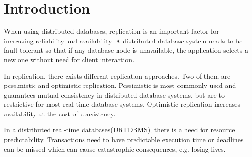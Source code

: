 \section{Introduction}
\label{sec:intro}

When using distributed databases, replication is an important factor for increasing reliability and availability. A distributed database system needs to be fault tolerant so that if any database node is unavailable, the application selects a new one without need for client interaction. 

In replication, there exists different replication approaches. Two of them are pessimistic and optimistic replication. Pessimistic is most commonly used and guarantees mutual consistency in distributed database systems, but are to restrictive for most real-time database systems. Optimistic replication increases availability at the cost of consistency. 

In a distributed real-time databases(DRTDBMS), there is a need for resource predictability. Transactions need to have predictable execution time or deadlines can be missed which can cause catastrophic consequences, e.g. losing lives.